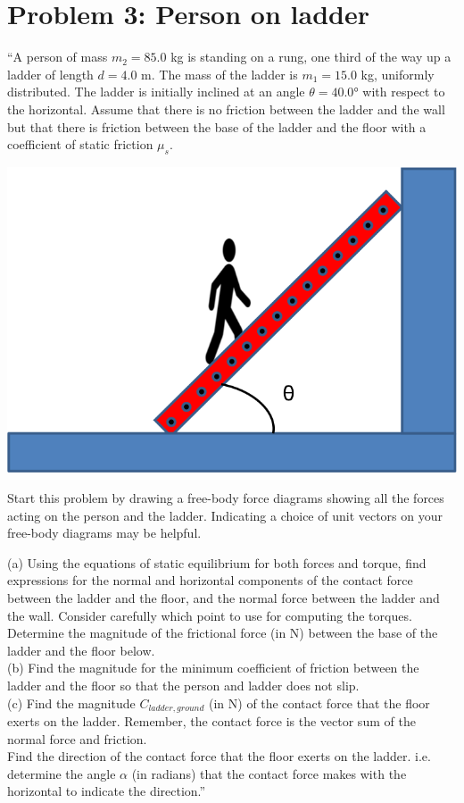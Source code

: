 \documentclass[8.01x]{subfiles}
\begin{document}
\section{Problem 3: Person on ladder}

``A person of mass $m_2 = 85.0$ kg is standing on a rung, one third of the way up a ladder of length $d = 4.0$ m. The mass of the ladder is $m_1 = 15.0$ kg, uniformly distributed. The ladder is initially inclined at an angle $\theta = \ang{40.0}$ with respect to the horizontal. Assume that there is no friction between the ladder and the wall but that there is friction between the base of the ladder and the floor with a coefficient of static friction $\mu_s$.

\begin{center}
\includegraphics[scale=0.8]{Graphics/h9p3}
\end{center}

Start this problem by drawing a free-body force diagrams showing all the forces acting on the person and the ladder. Indicating a choice of unit vectors on your free-body diagrams may be helpful.

(a) Using the equations of static equilibrium for both forces and torque, find expressions for the normal and horizontal components of the contact force between the ladder and the floor, and the normal force between the ladder and the wall. Consider carefully which point to use for computing the torques. Determine the magnitude of the frictional force (in N) between the base of the ladder and the floor below.\\
(b) Find the magnitude for the minimum coefficient of friction between the ladder and the floor so that the person and ladder does not slip.\\
(c) Find the magnitude $C_{ladder,ground}$ (in N) of the contact force that the floor exerts on the ladder. Remember, the contact force is the vector sum of the normal force and friction.\\
Find the direction of the contact force that the floor exerts on the ladder. i.e. determine the angle $\alpha$ (in radians) that the contact force makes with the horizontal to indicate the direction.''
\end{document}
